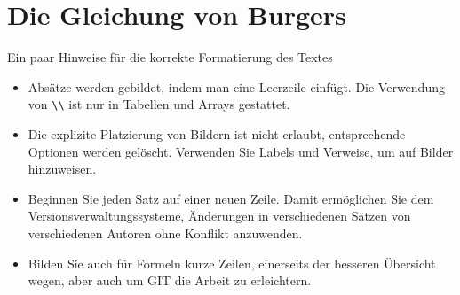 %
%
%
\chapter{Die Gleichung von Burgers\label{chapter:burgers}}
\begin{refsection}

Ein paar Hinweise für die korrekte Formatierung des Textes
\begin{itemize}
\item
Absätze werden gebildet, indem man eine Leerzeile einfügt.
Die Verwendung von \verb+\\+ ist nur in Tabellen und Arrays gestattet.
\item
Die explizite Platzierung von Bildern ist nicht erlaubt, entsprechende
Optionen werden gelöscht. 
Verwenden Sie Labels und Verweise, um auf Bilder hinzuweisen.
\item
Beginnen Sie jeden Satz auf einer neuen Zeile. 
Damit ermöglichen Sie dem Versionsverwaltungssysteme, Änderungen
in verschiedenen Sätzen von verschiedenen Autoren ohne Konflikt 
anzuwenden.
\item 
Bilden Sie auch für Formeln kurze Zeilen, einerseits der besseren
Übersicht wegen, aber auch um GIT die Arbeit zu erleichtern.
\end{itemize}






\printbibliography[heading=subbibliography]
\end{refsection}
